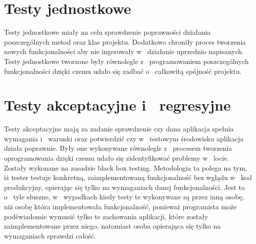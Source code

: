 \documentclass{BscUS}
\begin{document}
\section{Testy jednostkowe}
\indent Testy jednostkowe miały na celu sprawdzenie poprawności działania poszczególnych metod oraz klas projektu. Dodatkowo chroniły proces tworzenia nowych funkcjonalności aby nie ingerowały w~ działanie uprzednio napisanych. Testy jednostkowe tworzone były równolegle z~ programowaniem poszczególnych funkcjonalności dzięki czemu udało się zadbać o~ całkowitą spójność projektu.
\section{Testy akceptacyjne i~ regresyjne}
\indent Testy akceptacyjne mają za zadanie sprawdzenie czy dana aplikacja spełnia wymagania i~ warunki oraz potwierdzić czy w~ testowym środowisku aplikacja działa poprawnie. Były one wykonywane równolegle z~ procesem tworzenia oprogramowania dzięki czemu udało się zidentyfikować problemy w~ locie. Zostały wykonane na zasadzie black box testing. Metodologia ta polega na tym, iż tester testuje konkretną, zaimplementowaną funkcjonalność bez wglądu w~ kod produkcyjny, opierając się tylko na wymaganiach danej funkcjonalności. Jest to o~ tyle słuszne, w~ wypadkach kiedy testy te wykonywane są przez inną osobę, niż osobę która implementowała funkcjonalność, ponieważ programista może podświadomie wymusić tylko te zachowania aplikacji, które zostały zaimplementowane przez niego, natomiast osoba opierająca się tylko na wymaganiach sprawdzi całość.
\end{document}
